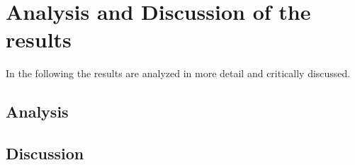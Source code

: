 \newpage
\section{Analysis and Discussion of the results}%
In the following the results are analyzed in more detail and critically discussed.

\subsection{Analysis}
\subsection{Discussion}%
